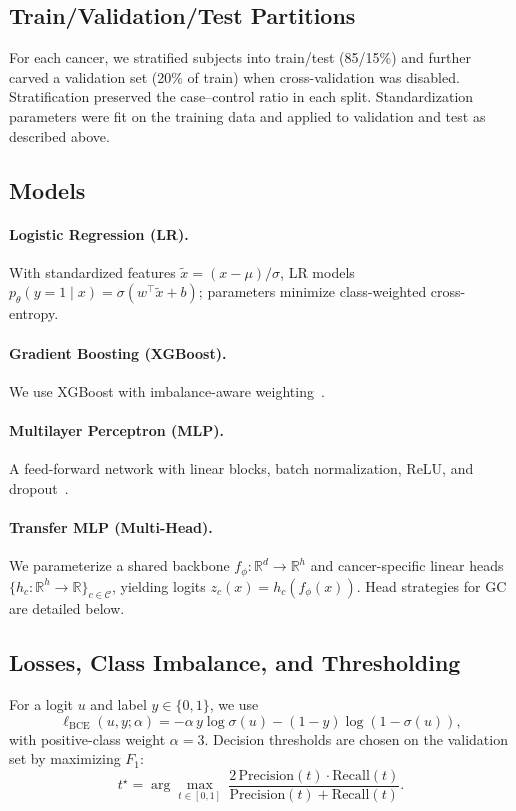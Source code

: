 \documentclass[journal,article,submit,pdftex,moreauthors]{Definitions/mdpi}
\begin{document}
\subsection{Train/Validation/Test Partitions}
For each cancer, we stratified subjects into train/test (85/15\%) and further carved a validation set (20\% of train) when cross-validation was disabled. Stratification preserved the case--control ratio in each split. Standardization parameters were fit on the training data and applied to validation and test as described above.

\subsection{Models}

\paragraph{Logistic Regression (LR).} With standardized features $\tilde{x}=(x-\mu)/\sigma$, LR models $p_\theta(y{=}1\mid x)=\sigma(w^\top \tilde{x}+b)$; parameters minimize class-weighted cross-entropy.

\paragraph{Gradient Boosting (XGBoost).} We use XGBoost with imbalance-aware weighting~\citep{Chen2016_XGBoost}.

\paragraph{Multilayer Perceptron (MLP).} A feed-forward network with linear blocks, batch normalization, ReLU, and dropout~\citep{Ioffe2015_BN,Srivastava2014_Dropout}.

\paragraph{Transfer MLP (Multi-Head).}
We parameterize a shared backbone $f_\phi:\mathbb{R}^d\!\to\!\mathbb{R}^h$ and cancer-specific linear heads $\{h_c:\mathbb{R}^h\!\to\!\mathbb{R}\}_{c\in\mathcal{C}}$, yielding logits $z_c(x)=h_c(f_\phi(x))$. Head strategies for GC are detailed below.

\subsection{Losses, Class Imbalance, and Thresholding}
For a logit $u$ and label $y\in\{0,1\}$, we use
\begin{equation}
\ell_{\mathrm{BCE}}(u,y;\alpha)=-\alpha\,y\log\sigma(u)-(1-y)\log(1-\sigma(u)),
\end{equation}
with positive-class weight $\alpha{=}3$. Decision thresholds are chosen on the validation set by maximizing $F_1$:
\begin{equation}
t^\star=\arg\max_{t\in[0,1]}\ \frac{2\,\mathrm{Precision}(t)\cdot\mathrm{Recall}(t)}{\mathrm{Precision}(t)+\mathrm{Recall}(t)}.
\end{equation}
\end{document}
